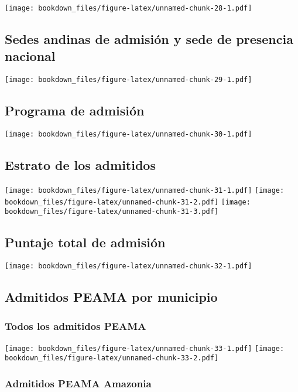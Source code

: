 \documentclass[]{article}
\theoremstyle{definition}
\theoremstyle{definition}
\theoremstyle{definition}
\theoremstyle{remark}
\begin{document}
\texttt{[image: bookdown\_files/figure-latex/unnamed-chunk-28-1.pdf]}

\subsection{Sedes andinas de admisión y sede de presencia
nacional}\label{sedes-andinas-de-admision-y-sede-de-presencia-nacional}

\texttt{[image: bookdown\_files/figure-latex/unnamed-chunk-29-1.pdf]}

\subsection{Programa de admisión}\label{programa-de-admision}

\texttt{[image: bookdown\_files/figure-latex/unnamed-chunk-30-1.pdf]}

\subsection{Estrato de los admitidos}\label{estrato-de-los-admitidos}

\texttt{[image: bookdown\_files/figure-latex/unnamed-chunk-31-1.pdf]}
\texttt{[image: bookdown\_files/figure-latex/unnamed-chunk-31-2.pdf]}
\texttt{[image: bookdown\_files/figure-latex/unnamed-chunk-31-3.pdf]}

\subsection{Puntaje total de admisión}\label{puntaje-total-de-admision}

\texttt{[image: bookdown\_files/figure-latex/unnamed-chunk-32-1.pdf]}

\subsection{Admitidos PEAMA por
municipio}\label{admitidos-peama-por-municipio}

\subsubsection{Todos los admitidos
PEAMA}\label{todos-los-admitidos-peama}

\texttt{[image: bookdown\_files/figure-latex/unnamed-chunk-33-1.pdf]}
\texttt{[image: bookdown\_files/figure-latex/unnamed-chunk-33-2.pdf]}

\subsubsection{Admitidos PEAMA Amazonia}\label{admitidos-peama-amazonia}
\end{document}

